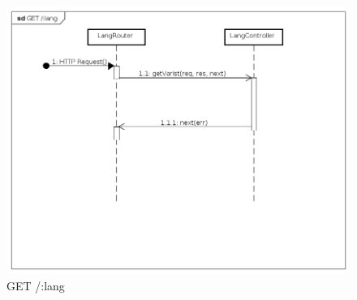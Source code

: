 \begin{itemize}
\label{Fallimento della procedura di traduzione}
\begin{figure}[ht]
	\centering
	\includegraphics[scale=0.40]{UML/DiagrammiDiSequenza/Back-end/GET_lang_failure.png}
	\caption{GET /:lang}
\end{figure}
\FloatBarrier
\end{itemize}


